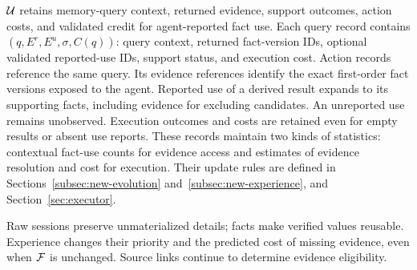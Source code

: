 $\mathcal{U}$ retains memory-query context, returned evidence, support outcomes,
action costs, and validated credit for agent-reported fact use.
Each query record contains $(q,E^r,E^u,\sigma,C(q))$: query context,
returned fact-version IDs, optional validated reported-use IDs, support
status, and execution cost. Action records reference the same query.
Its evidence references identify the exact first-order
fact versions exposed to the agent. Reported use of a derived result expands
to its supporting facts, including evidence for excluding candidates.
An unreported use remains unobserved. Execution outcomes and costs are
retained even for empty results or absent use reports.
These records maintain two kinds of statistics: contextual fact-use
counts for evidence access and estimates of evidence resolution and cost for
execution. Their update rules are defined in
Sections~\ref{subsec:new-evolution} and~\ref{subsec:new-experience},
and Section~\ref{sec:executor}.

Raw sessions preserve unmaterialized details; facts make verified values
reusable. Experience changes their priority and the predicted cost of
missing evidence, even when $\mathcal{F}$ is unchanged. Source links continue
to determine evidence eligibility.

